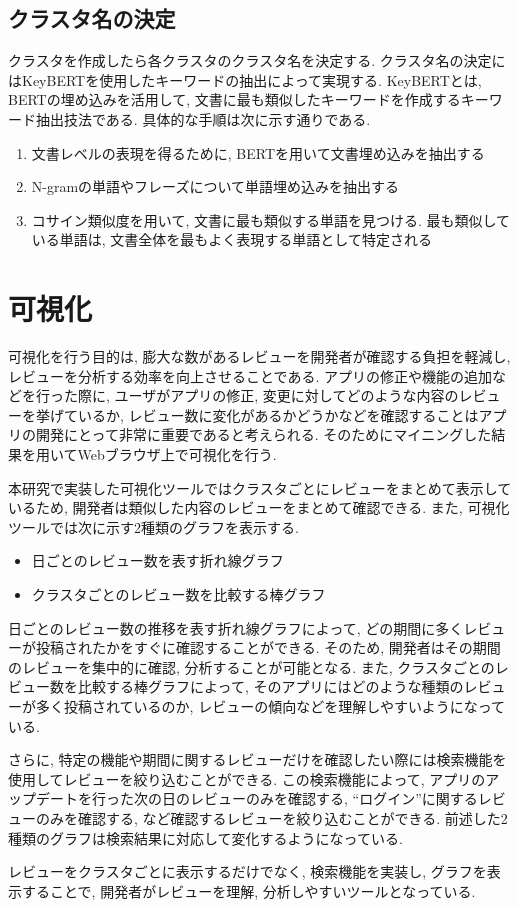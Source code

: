 \subsection{クラスタ名の決定}
クラスタを作成したら各クラスタのクラスタ名を決定する. 
クラスタ名の決定にはKeyBERT\cite{keybert}を使用したキーワードの抽出によって実現する. KeyBERTとは, BERTの埋め込みを活用して, 文書に最も類似したキーワードを作成するキーワード抽出技法である. 
具体的な手順は次に示す通りである. 

\begin{enumerate}
  \item 文書レベルの表現を得るために, BERTを用いて文書埋め込みを抽出する
  \item N-gramの単語やフレーズについて単語埋め込みを抽出する
  \item コサイン類似度を用いて, 文書に最も類似する単語を見つける. 最も類似している単語は, 文書全体を最もよく表現する単語として特定される
\end{enumerate}


\section{可視化}\label{visualization}
可視化を行う目的は, 膨大な数があるレビューを開発者が確認する負担を軽減し, レビューを分析する効率を向上させることである. 
アプリの修正や機能の追加などを行った際に, ユーザがアプリの修正, 変更に対してどのような内容のレビューを挙げているか, レビュー数に変化があるかどうかなどを確認することはアプリの開発にとって非常に重要であると考えられる. 
そのためにマイニングした結果を用いてWebブラウザ上で可視化を行う. 

本研究で実装した可視化ツールではクラスタごとにレビューをまとめて表示しているため, 開発者は類似した内容のレビューをまとめて確認できる. 
また, 可視化ツールでは次に示す2種類のグラフを表示する. 
\begin{itemize}
  \item 日ごとのレビュー数を表す折れ線グラフ
  \item クラスタごとのレビュー数を比較する棒グラフ
\end{itemize}
日ごとのレビュー数の推移を表す折れ線グラフによって, どの期間に多くレビューが投稿されたかをすぐに確認することができる. そのため, 開発者はその期間のレビューを集中的に確認, 分析することが可能となる. 
また, クラスタごとのレビュー数を比較する棒グラフによって, そのアプリにはどのような種類のレビューが多く投稿されているのか, レビューの傾向などを理解しやすいようになっている. 

さらに, 特定の機能や期間に関するレビューだけを確認したい際には検索機能を使用してレビューを絞り込むことができる. この検索機能によって, アプリのアップデートを行った次の日のレビューのみを確認する, ``ログイン''に関するレビューのみを確認する, など確認するレビューを絞り込むことができる. 
前述した2種類のグラフは検索結果に対応して変化するようになっている. 

レビューをクラスタごとに表示するだけでなく, 検索機能を実装し, グラフを表示することで, 開発者がレビューを理解, 分析しやすいツールとなっている. 